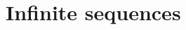 \documentclass[../book/calcnotes.tex]{subfiles}
\begin{document}
\section{Infinite sequences}
\label{sec:seq-intro}

\begin{exercises}
\end{exercises}
\end{document}

